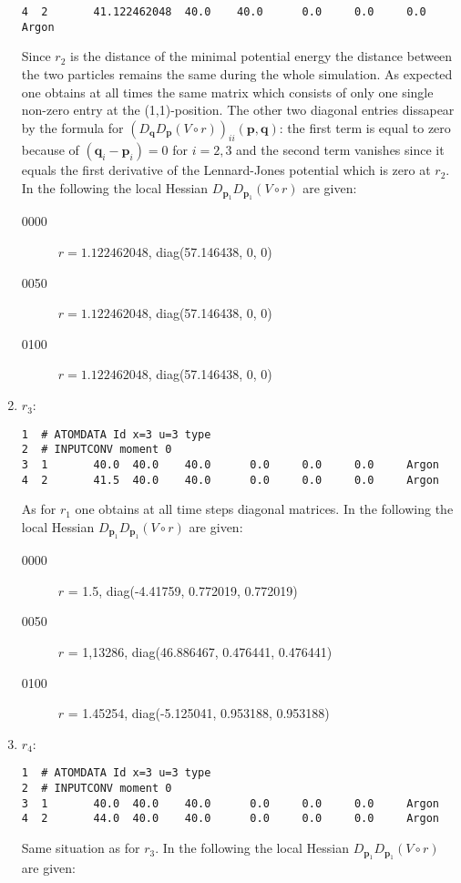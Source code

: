 \documentclass[a4paper]{article}
\newcommand{\boldp}{\boldsymbol{p}}
\newcommand{\boldq}{\boldsymbol{q}}
\begin{document}
\begin{enumerate}
\begin{verbatim}
4  2       41.122462048  40.0    40.0      0.0     0.0     0.0     Argon
\end{verbatim}
Since \(r_2\) is the distance of the minimal potential energy the distance between the two particles remains the same during the whole simulation.
As expected one obtains at all times the same matrix which consists of only one single non-zero entry at the (1,1)-position.
The other two diagonal entries dissapear by the formula for \((D_{\boldq}D_{\boldp} (V\circ r))_{ii}(\boldp, \boldq)\): the first term is equal to zero because of \((\boldq_i - \boldp_i) = 0\) for \(i=2, 3\) and
the second term vanishes since it equals the first derivative of the Lennard-Jones potential which is zero at \(r_2\).
In the following the local Hessian \(D_{\boldp_1} D_{\boldp_1} (V\circ r)\) are given:
\begin{description}
\item[{0000}] \(r = 1.122462048\), diag(57.146438, 0, 0)
\item[{0050}] \(r = 1.122462048\), diag(57.146438, 0, 0)
\item[{0100}] \(r = 1.122462048\), diag(57.146438, 0, 0)
\end{description}
\item \(r_3\):
\label{sec-1-4-1-4}
\begin{verbatim}
1  # ATOMDATA Id x=3 u=3 type
2  # INPUTCONV moment 0
3  1       40.0  40.0    40.0      0.0     0.0     0.0     Argon
4  2       41.5  40.0    40.0      0.0     0.0     0.0     Argon
\end{verbatim}
As for \(r_1\) one obtains at all time steps diagonal matrices.
In the following the local Hessian \(D_{\boldp_1} D_{\boldp_1} (V\circ r)\) are given:
\begin{description}
\item[{0000}] \(r\) = 1.5, diag(-4.41759, 0.772019, 0.772019)
\item[{0050}] \(r\) = 1,13286, diag(46.886467, 0.476441, 0.476441)
\item[{0100}] \(r\) = 1.45254, diag(-5.125041, 0.953188, 0.953188)
\end{description}
\item \(r_4\):
\label{sec-1-4-1-5}
\begin{verbatim}
1  # ATOMDATA Id x=3 u=3 type
2  # INPUTCONV moment 0
3  1       40.0  40.0    40.0      0.0     0.0     0.0     Argon
4  2       44.0  40.0    40.0      0.0     0.0     0.0     Argon
\end{verbatim}
Same situation as for \(r_3\).
In the following the local Hessian \(D_{\boldp_1} D_{\boldp_1} (V\circ r)\) are given:

\end{enumerate}
\end{document}
